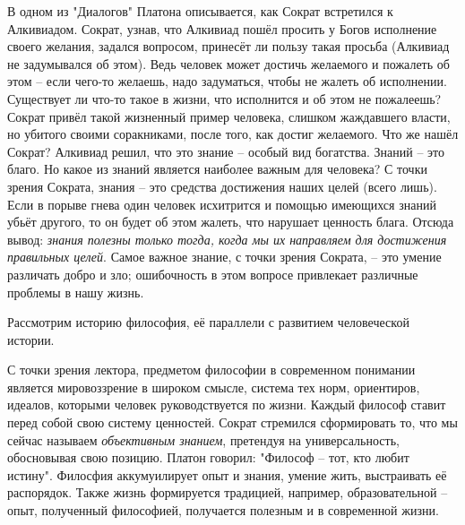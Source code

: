 \documentclass[a4paper, 12pt]{book} %
\begin{document}
В одном из "Диалогов" Платона описывается, как Сократ встретился к Алкивиадом. Сократ, узнав, что Алкивиад пошёл просить у Богов исполнение своего желания, задался вопросом, принесёт ли пользу такая просьба (Алкивиад не задумывался об этом). Ведь человек может достичь желаемого и пожалеть об этом -- если чего-то желаешь, надо задуматься, чтобы не жалеть об исполнении. Существует ли что-то такое в жизни, что исполнится и об этом не пожалеешь? Сократ привёл такой жизненный пример человека, слишком жаждавшего власти, но убитого своими соракниками, после того, как достиг желаемого. Что же нашёл Сократ? Алкивиад решил, что это знание -- особый вид богатства. Знаний -- это благо. Но какое из знаний является наиболее важным для человека? С точки зрения Сократа, знания -- это средства достижения наших целей (всего лишь). Если в порыве гнева один человек исхитрится и помощью имеющихся знаний убьёт другого, то он будет об этом жалеть, что нарушает ценность блага. Отсюда вывод: \textit{знания полезны только тогда, когда мы их направляем для достижения правильных целей}. Самое важное знание, с точки зрения Сократа, -- это умение различать добро и зло; ошибочность в этом вопросе привлекает различные проблемы в нашу жизнь.

Рассмотрим историю философия, её параллели с развитием человеческой истории.

С точки зрения лектора, предметом философии в современном понимании является мировоззрение в широком смысле, система тех норм, ориентиров, идеалов, которыми человек руководствуется по жизни. Каждый философ ставит перед собой свою систему ценностей. Сократ стремился сформировать то, что мы сейчас называем \textit{объективным знанием}, претендуя на универсальность, обосновывая свою позицию. Платон говорил: "Философ -- тот, кто любит истину". Филосфия аккумуилирует опыт и знания, умение жить, выстраивать её распорядок. Также жизнь формируется традицией, например, образовательной -- опыт, полученный философией, получается полезным и в современной жизни.
\end{document}
